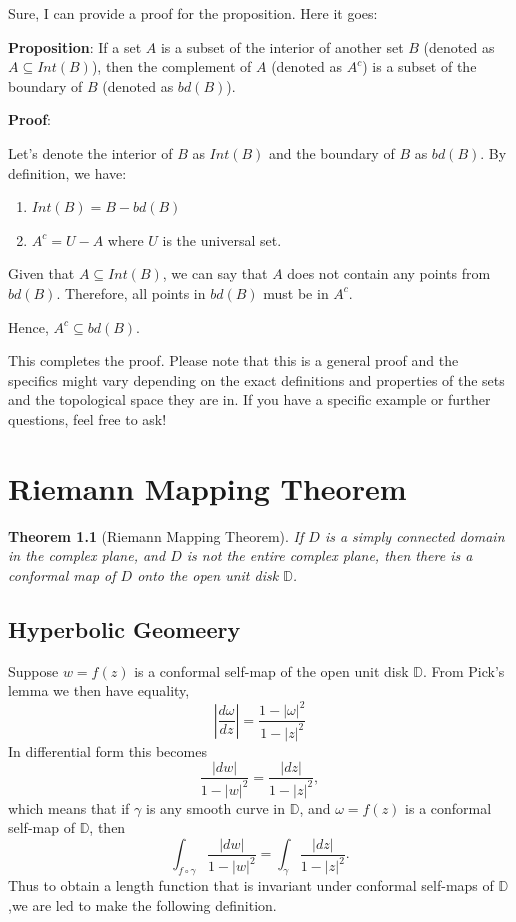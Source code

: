 \documentclass[
]{book}
\providecommand{\tightlist}{%
  \setlength{\itemsep}{0pt}\setlength{\parskip}{0pt}}
\newtheorem{theorem}{Theorem}[chapter]
\theoremstyle{definition}
\theoremstyle{definition}
\theoremstyle{definition}
\theoremstyle{definition}
\theoremstyle{remark}
\begin{document}
Sure, I can provide a proof for the proposition. Here it goes:

\textbf{Proposition}: If a set \(A\) is a subset of the interior of another set \(B\) (denoted as \(A \subseteq Int(B)\)), then the complement of \(A\) (denoted as \(A^c\)) is a subset of the boundary of \(B\) (denoted as \(bd(B)\)).

\textbf{Proof}:

Let's denote the interior of \(B\) as \(Int(B)\) and the boundary of \(B\) as \(bd(B)\). By definition, we have:

\begin{enumerate}
\def\labelenumi{\arabic{enumi}.}
\tightlist
\item
  \(Int(B) = B - bd(B)\)
\item
  \(A^c = U - A\) where \(U\) is the universal set.
\end{enumerate}

Given that \(A \subseteq Int(B)\), we can say that \(A\) does not contain any points from \(bd(B)\). Therefore, all points in \(bd(B)\) must be in \(A^c\).

Hence, \(A^c \subseteq bd(B)\).

This completes the proof. Please note that this is a general proof and the specifics might vary depending on the exact definitions and properties of the sets and the topological space they are in. If you have a specific example or further questions, feel free to ask!

\chapter{Riemann Mapping Theorem}\label{riemann-mapping-theorem}

\begin{theorem}[Riemann Mapping Theorem]
\protect\hypertarget{thm:unnamed-chunk-32}{}\label{thm:unnamed-chunk-32}If \(D\) is a simply connected domain in the complex plane, and \(D\) is not the entire complex plane, then there is a conformal map of \(D\) onto the open unit disk \(\mathbb{D}\).
\end{theorem}

\section{Hyperbolic Geomeery}\label{hyperbolic-geomeery}

Suppose \(w = f(z)\) is a conformal self-map of the open unit disk \(\mathbb{D}\). From Pick's lemma we then have equality,
\[\left|\frac{d\omega}{dz}\right|=\frac{1-|\omega|^2}{1-|z|^2}\]
In differential form this becomes
\[\frac{|dw|}{1-|w|^2} = \frac{|dz|}{1-|z|^2},\]
which means that if \(\gamma\) is any smooth curve in \(\mathbb{D}\), and \(\omega=f(z)\) is a conformal self-map of \(\mathbb{D}\), then
\[\int_{f\circ \gamma}\frac{|dw|}{1-|w|^2} =\int_{\gamma} \frac{|dz|}{1-|z|^2}.\]
Thus to obtain a length function that is invariant under conformal self-maps of \(\mathbb{D}\),we are led to make the following definition.
\end{document}

